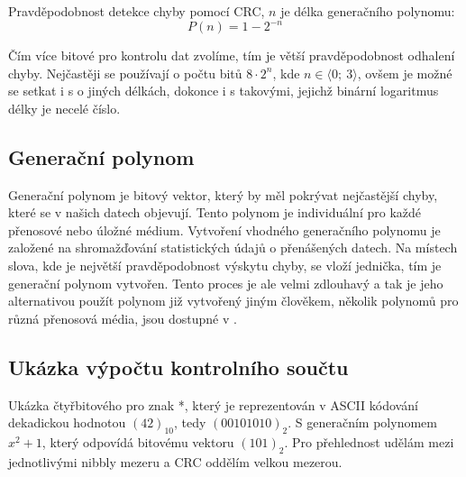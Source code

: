 Pravděpodobnost detekce chyby pomocí CRC, $n$ je délka generačního polynomu:
\begin{equation}
    P(n) = 1 - 2^{-n} \nonumber
\end{equation}

Čím více bitové  pro kontrolu dat zvolíme, tím je větší pravděpodobnost odhalení chyby. Nejčastěji se používají  o počtu bitů $8 \cdot 2^n$, kde $n \in \langle 0;~3\rangle$, ovšem je možné se setkat i s  o jiných délkách, dokonce i s takovými, jejichž binární logaritmus délky je necelé číslo.



\subsection{Generační polynom}
Generační polynom je bitový vektor, který by měl pokrývat nejčastější chyby, které se v našich datech objevují. Tento polynom je individuální pro každé přenosové nebo úložné médium. Vytvoření vhodného generačního polynomu je založené na shromažďování statistických údajů o přenášených datech. Na místech slova, kde je největší pravděpodobnost výskytu chyby, se vloží jednička, tím je generační polynom vytvořen. Tento proces je ale velmi zdlouhavý a tak je jeho alternativou použít polynom již vytvořený jiným člověkem, několik polynomů pro různá přenosová média, jsou dostupné v \cite{crc-wiki}.

\subsection{Ukázka výpočtu kontrolního součtu}

Ukázka čtyřbitového  pro znak *, který je reprezentován v ASCII kódování dekadickou hodnotou $(42)_{10}$, tedy $(00101010)_2$. S generačním polynomem $x^2+1$, který odpovídá bitovému vektoru $(101)_2$. Pro přehlednost udělám mezi jednotlivými nibbly mezeru a CRC oddělím velkou mezerou.

